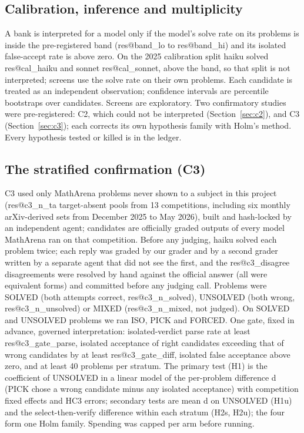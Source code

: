 \documentclass[10pt,twocolumn]{article}
\makeatletter
\newcommand{\res}[1]{\csname res@#1\endcsname}
\makeatother
\begin{document}
\subsection{Calibration, inference and multiplicity}
A bank is interpreted for a model only if the model's solve rate on its problems is inside the pre-registered band (\res{band_lo} to \res{band_hi}) and its isolated false-accept rate is above zero. On the 2025 calibration split haiku solved \res{cal_haiku} and sonnet \res{cal_sonnet}, above the band, so that split is not interpreted; screens use the solve rate on their own problems. Each candidate is treated as an independent observation; confidence intervals are percentile bootstraps over candidates. Screens are exploratory. Two confirmatory studies were pre-registered: C2, which could not be interpreted (Section~\ref{sec:c2}), and C3 (Section~\ref{sec:c3}); each corrects its own hypothesis family with Holm's method. Every hypothesis tested or killed is in the ledger.

\subsection{The stratified confirmation (C3)}
C3 used only MathArena problems never shown to a subject in this project (\res{c3_n_ta} target-absent pools from 13 competitions, including six monthly arXiv-derived sets from December 2025 to May 2026), built and hash-locked by an independent agent; candidates are officially graded outputs of every model MathArena ran on that competition. Before any judging, haiku solved each problem twice; each reply was graded by our grader and by a second grader written by a separate agent that did not see the first, and the \res{c3_disagree} disagreements were resolved by hand against the official answer (all were equivalent forms) and committed before any judging call. Problems were SOLVED (both attempts correct, \res{c3_n_solved}), UNSOLVED (both wrong, \res{c3_n_unsolved}) or MIXED (\res{c3_n_mixed}, not judged). On SOLVED and UNSOLVED problems we ran ISO, PICK and FORCED. One gate, fixed in advance, governed interpretation: isolated-verdict parse rate at least \res{c3_gate_parse}, isolated acceptance of right candidates exceeding that of wrong candidates by at least \res{c3_gate_diff}, isolated false acceptance above zero, and at least 40 problems per stratum. The primary test (H1) is the coefficient of UNSOLVED in a linear model of the per-problem difference d (PICK chose a wrong candidate minus any isolated acceptance) with competition fixed effects and HC3 errors; secondary tests are mean d on UNSOLVED (H1u) and the select-then-verify difference within each stratum (H2s, H2u); the four form one Holm family. Spending was capped per arm before running.
\end{document}
